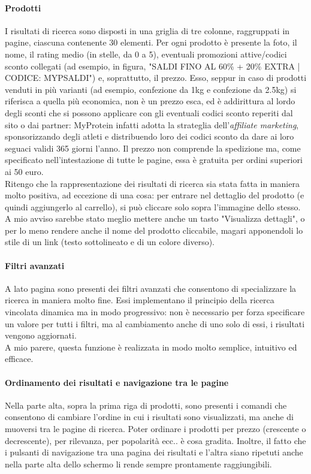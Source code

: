 \paragraph{Prodotti}
I risultati di ricerca sono disposti in una griglia di tre colonne, raggruppati in pagine, ciascuna contenente 30 elementi.
Per ogni prodotto è presente la foto, il nome, il rating medio (in stelle, da 0 a 5), eventuali promozioni attive/codici sconto collegati (ad esempio, in figura, "SALDI FINO AL 60\% + 20\% EXTRA | CODICE: MYPSALDI") e, soprattutto, il prezzo. Esso, seppur in caso di prodotti venduti in più varianti (ad esempio, confezione da 1kg e confezione da 2.5kg) si riferisca a quella più economica, non è un prezzo esca, ed è addirittura al lordo degli sconti che si possono applicare con gli eventuali codici sconto reperiti dal sito o dai partner: MyProtein infatti adotta la strateglia dell'\textit{affiliate marketing}, sponsorizzando degli atleti e distribuendo loro dei codici sconto da dare ai loro seguaci validi 365 giorni l'anno. Il prezzo non comprende la spedizione ma, come specificato nell'intestazione di tutte le pagine, essa è gratuita per ordini superiori ai 50 euro. \\
Ritengo che la rappresentazione dei risultati di ricerca sia stata fatta in maniera molto positiva, ad eccezione di una cosa: per entrare nel dettaglio del prodotto (e quindi aggiungerlo al carrello), si può cliccare solo sopra l'immagine dello stesso. A mio avviso sarebbe stato meglio mettere anche un tasto "Visualizza dettagli", o per lo meno rendere anche il nome del prodotto cliccabile, magari apponendoli lo stile di un link (testo sottolineato e di un colore diverso).

\paragraph{Filtri avanzati}
A lato pagina sono presenti dei filtri avanzati che consentono di specializzare la ricerca in maniera molto fine. Essi implementano il principio della ricerca vincolata dinamica ma in modo progressivo: non è necessario per forza specificare un valore per tutti i filtri, ma al cambiamento anche di uno solo di essi, i risultati vengono aggiornati.\\
A mio parere, questa funzione è realizzata in modo molto semplice, intuitivo ed efficace.

\paragraph{Ordinamento dei risultati e navigazione tra le pagine}
Nella parte alta, sopra la prima riga di prodotti, sono presenti i comandi che consentono di cambiare l'ordine in cui i risultati sono visualizzati, ma anche di muoversi tra le pagine di ricerca. Poter ordinare i prodotti per prezzo (crescente o decrescente), per rilevanza, per popolarità ecc.. è cosa gradita. Inoltre, il fatto che i pulsanti di navigazione tra una pagina dei risultati e l'altra siano ripetuti anche nella parte alta dello schermo li rende sempre prontamente raggiungibili.

